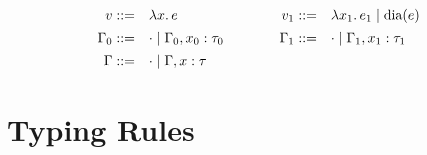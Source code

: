 \documentclass{article}
\begin{document}
\[\begin{array}{rlcrl}
                \vspace{1ex}
                \\
           v ::= & \lambda x.\,e
                 & \hspace{2em} &
         v_1 ::= & \lambda x_1.\,e_1
              \mid \text{dia}(e)
                \vspace{1ex}
                \\
    \Gamma_0 ::= & \cdot
              \mid \Gamma_0, x_0 : \tau_0
                 & \hspace{2em} &
    \Gamma_1 ::= & \cdot
              \mid \Gamma_1, x_1 : \tau_1
                \vspace{1ex}
                \\
      \Gamma ::= & \cdot
              \mid \Gamma, x : \tau
\end{array}
\]

\section{Typing Rules}

%
%
%
%

%
%
%
%
\end{document}
